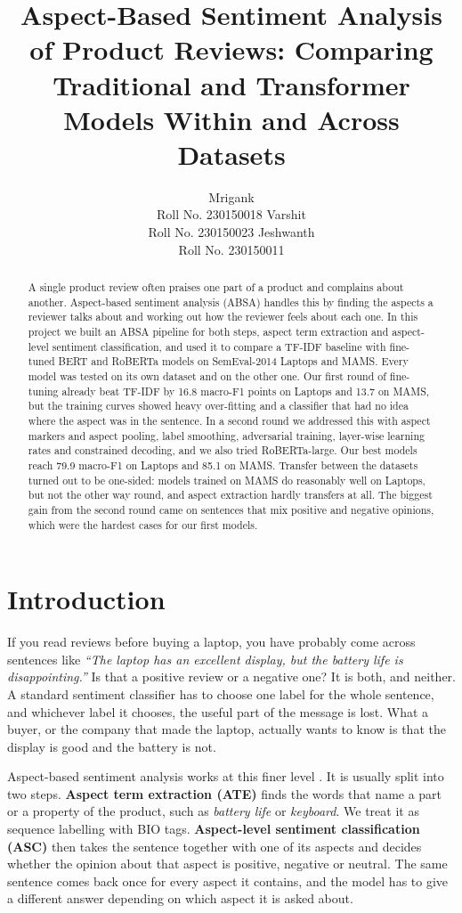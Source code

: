 \documentclass[11pt]{article}
\title{Aspect-Based Sentiment Analysis of Product Reviews: Comparing Traditional and Transformer Models Within and Across Datasets}
\author{Mrigank \\ Roll No. 230150018 \And Varshit \\ Roll No. 230150023 \And Jeshwanth \\ Roll No. 230150011}
\begin{document}
\maketitle
\begin{abstract}
A single product review often praises one part of a product and complains about another. Aspect-based sentiment analysis (ABSA) handles this by finding the aspects a reviewer talks about and working out how the reviewer feels about each one. In this project we built an ABSA pipeline for both steps, aspect term extraction and aspect-level sentiment classification, and used it to compare a TF-IDF baseline with fine-tuned BERT and RoBERTa models on SemEval-2014 Laptops and MAMS. Every model was tested on its own dataset and on the other one. Our first round of fine-tuning already beat TF-IDF by 16.8 macro-F1 points on Laptops and 13.7 on MAMS, but the training curves showed heavy over-fitting and a classifier that had no idea where the aspect was in the sentence. In a second round we addressed this with aspect markers and aspect pooling, label smoothing, adversarial training, layer-wise learning rates and constrained decoding, and we also tried RoBERTa-large. Our best models reach 79.9 macro-F1 on Laptops and 85.1 on MAMS. Transfer between the datasets turned out to be one-sided: models trained on MAMS do reasonably well on Laptops, but not the other way round, and aspect extraction hardly transfers at all. The biggest gain from the second round came on sentences that mix positive and negative opinions, which were the hardest cases for our first models.
\end{abstract}

\section{Introduction}
If you read reviews before buying a laptop, you have probably come across sentences like \textit{``The laptop has an excellent display, but the battery life is disappointing.''} Is that a positive review or a negative one? It is both, and neither. A standard sentiment classifier has to choose one label for the whole sentence, and whichever label it chooses, the useful part of the message is lost. What a buyer, or the company that made the laptop, actually wants to know is that the display is good and the battery is not.

Aspect-based sentiment analysis works at this finer level \citep{hu2004mining,pontiki2014semeval}. It is usually split into two steps. \textbf{Aspect term extraction (ATE)} finds the words that name a part or a property of the product, such as \textit{battery life} or \textit{keyboard}. We treat it as sequence labelling with BIO tags. \textbf{Aspect-level sentiment classification (ASC)} then takes the sentence together with one of its aspects and decides whether the opinion about that aspect is positive, negative or neutral. The same sentence comes back once for every aspect it contains, and the model has to give a different answer depending on which aspect it is asked about.
\end{document}
